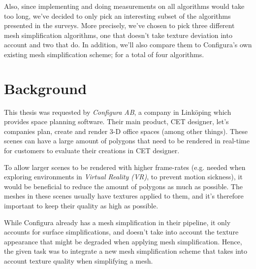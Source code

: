 Also, since implementing and doing measurements on all algorithms would take too long, we've decided to only pick an interesting subset of the algorithms presented in the surveys. More precisely, we've chosen to pick three different mesh simplification algorithms, one that doesn't take texture deviation into account and two that do. In addition, we'll also compare them to Configura's own existing mesh simplification scheme; for a total of four algorithms.

\section{Background}
\label{sec:background}

This thesis was requested by \emph{Configura AB}, a company in Linköping which provides space planning software. Their main product, CET designer, let's companies plan, create and render 3-D office spaces (among other things). These scenes can have a large amount of polygons that need to be rendered in real-time for customers to evaluate their creations in CET designer.

To allow larger scenes to be rendered with higher frame-rates (e.g. needed when exploring environments in \emph{Virtual Reality (VR)}, to prevent motion sickness), it would be beneficial to reduce the amount of polygons as much as possible. The meshes in these scenes usually have textures applied to them, and it's therefore important to keep their quality as high as possible.

While Configura already has a mesh simplification in their pipeline, it only accounts for surface simplifications, and doesn't take into account the texture appearance that might be degraded when applying mesh simplification. Hence, the given task was to integrate a new mesh simplification scheme that takes into account texture quality when simplifying a mesh.



